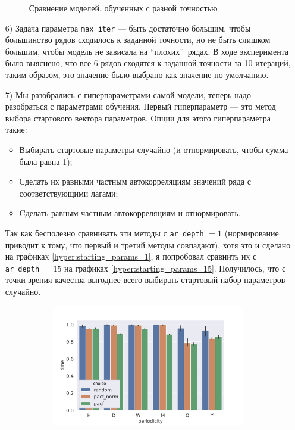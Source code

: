 \documentclass[a4paper,14pt]{extarticle}
\begin{document}
\begin{enumerate}
\begin{figure}[!h]
\begin{subfigure}[b]{.5\linewidth}
				\label{hyper:tolerance:mse}
			\end{subfigure}
			\caption{Сравнение моделей, обученных с разной точностью}
			\label{hyper:tolerance}
		\end{figure}
       	\item[6)] Задача параметра \texttt{max\_iter} --- быть достаточно большим, чтобы большинство рядов сходилось к заданной точности, но не быть слишком большим, чтобы модель не зависала на \textquotedblleft плохих\textquotedblright\ рядах. В ходе эксперимента было выяснено, что все 6 рядов сходятся к заданной точности за 10 итераций, таким образом, это значение было выбрано как значение по умолчанию.
        \item[7)] Мы разобрались с гиперпараметрами самой модели, теперь надо разобраться с параметрами обучения. Первый гиперпараметр --- это метод выбора стартового вектора параметров. Опции для этого гиперпараметра такие:
		\begin{itemize}
			\item Выбирать стартовые параметры случайно (и отнормировать, чтобы сумма была равна 1);
   			\item Сделать их равными частным автокорреляциям значений ряда с соответствующими лагами;
      		\item Cделать равным частным автокорреляциям и отнормировать.
		\end{itemize}
		Так как бесполезно сравнивать эти методы с \texttt{ar\_depth} $ = 1$ (нормирование приводит к тому, что первый и третий методы совпадают), хотя это и сделано на графиках \ref{hyper:starting_params_1}, я попробовал сравнить их с \texttt{ar\_depth} $ = 15$ на графиках \ref{hyper:starting_params_15}. Получилось, что с точки зрения качества выгоднее всего выбирать стартовый набор параметров случайно.
        \begin{figure}[!h]
			\captionsetup{justification=centering}
			\begin{subfigure}[b]{.5\linewidth}
				\centering
				\includegraphics[width=\linewidth]{pictures/hyper-starting_params-time.pdf}

\end{subfigure}
\end{figure}
\end{enumerate}
\end{document}
